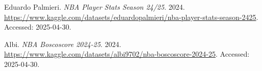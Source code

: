 \documentclass{article}
\begin{document}

\begin{thebibliography}{9}

Eduardo Palmieri. \emph{NBA Player Stats Season 24/25}. 2024.  
\url{https://www.kaggle.com/datasets/eduardopalmieri/nba-player-stats-season-2425}. Accessed: 2025-04-30.

Albi. \emph{NBA Boscoscore 2024-25}. 2024.  
\url{https://www.kaggle.com/datasets/albi9702/nba-boscoscore-2024-25}. Accessed: 2025-04-30.

\end{thebibliography}
\end{document}
